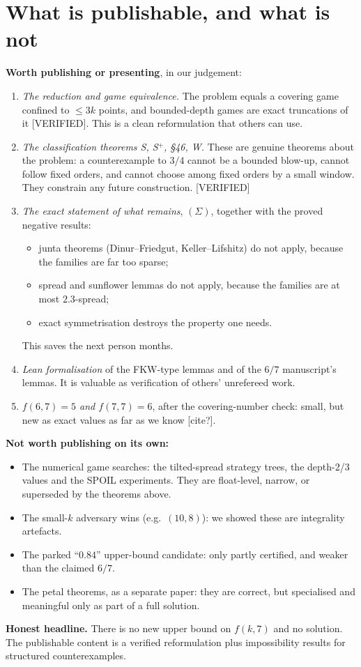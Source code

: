 \documentclass[11pt]{article}
\newcommand{\st}[1]{\textsf{\small[#1]}}
\begin{document}
\section{What is publishable, and what is not}
\textbf{Worth publishing or presenting}, in our judgement:
\begin{enumerate}
\item \emph{The reduction and game equivalence.} The problem equals a covering game confined to $\le3k$ points, and
bounded-depth games are exact truncations of it \st{VERIFIED}. This is a clean reformulation that others can use.
\item \emph{The classification theorems S, S$^+$, \S46, W.} These are genuine theorems about the problem: a
counterexample to $3/4$ cannot be a bounded blow-up, cannot follow fixed orders, and cannot choose among fixed orders
by a small window. They constrain any future construction. \st{VERIFIED}
\item \emph{The exact statement of what remains}, $(\Sigma)$, together with the proved negative results:
 \begin{itemize}
 \item junta theorems (Dinur--Friedgut, Keller--Lifshitz) do not apply, because the families are far too sparse;
 \item spread and sunflower lemmas do not apply, because the families are at most $2.3$-spread;
 \item exact symmetrisation destroys the property one needs.
 \end{itemize}
 This saves the next person months.
\item \emph{Lean formalisation} of the FKW-type lemmas and of the $6/7$ manuscript's lemmas. It is valuable as
verification of others' unrefereed work.
\item \emph{$f(6,7)=5$ and $f(7,7)=6$}, after the covering-number check: small, but new as exact values as far as we
know \st{cite?}.
\end{enumerate}
\textbf{Not worth publishing on its own:}
\begin{itemize}
\item The numerical game searches: the tilted-spread strategy trees, the depth-2/3 values and the SPOIL experiments.
They are float-level, narrow, or superseded by the theorems above.
\item The small-$k$ adversary wins (e.g.\ $(10,8)$): we showed these are integrality artefacts.
\item The parked ``$0.84$'' upper-bound candidate: only partly certified, and weaker than the claimed $6/7$.
\item The petal theorems, as a separate paper: they are correct, but specialised and meaningful only as part of a
full solution.
\end{itemize}
\textbf{Honest headline.} There is no new upper bound on $f(k,7)$ and no solution. The publishable content is a
verified reformulation plus impossibility results for structured counterexamples.
\end{document}
